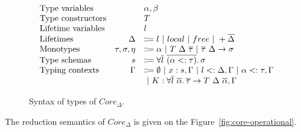 \documentclass[11pt]{article}
\newcommand{\vor}{~|~}
\newcommand{\ap}{~}
\begin{document}
    \begin{figure}
        \[
            \begin{array}{lrl}
                \text{Type variables}     &                    & \alpha, \beta                                                                                                      \\
                \text{Type constructors}  &                    & T                                                                                                                  \\
                \text{Lifetime variables} &                    & l                                                                                                                  \\
                \text{Lifetimes}          & \Delta             & \Coloneqq l \vor local \vor free \vor +\overline{\Delta}                                                           \\
                \text{Monotypes}          & \tau, \sigma, \eta & \Coloneqq \alpha \vor T \ap \Delta \ap \overline{\tau} \vor \overline{\tau}~\Delta \to \sigma                      \\
                \text{Type schemas}       & s                  & \Coloneqq \forall \overline{l}~\overline{(\alpha <: \tau)}\ldotp \sigma                                            \\
                \text{Typing contexts}    & \Gamma             & \Coloneqq \emptyset \vor x : s, \Gamma \vor l <: \Delta, \Gamma \vor \alpha <: \tau, \Gamma                        \\
                &                    & \vor K : \forall \overline{l}\ \overline{\alpha}\ldotp \overline{\tau}\to T \ap\Delta\ap \overline{\alpha}, \Gamma
            \end{array}
        \]
        \caption{Syntax of types of $Core_\Delta$.}
        \label{fig:core-types}
    \end{figure}

    The reduction semantics of $Core_\Delta$ is given on the Figure\ \ref{fig:core-operational}.
\end{document}
